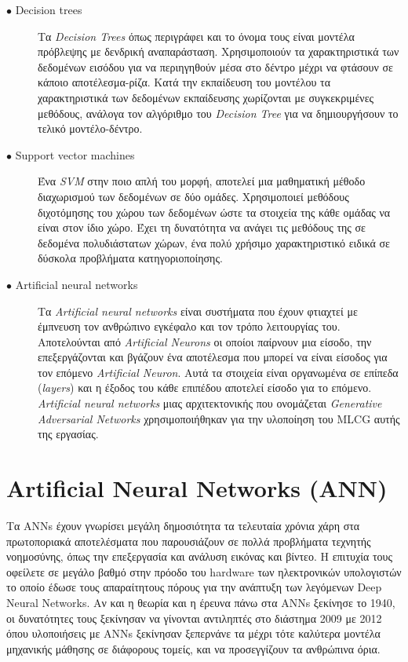 \begin{description}

\item[$\bullet$ Decision trees] Τα \textit{Decision Trees} όπως περιγράφει και το όνομα τους είναι μοντέλα πρόβλεψης με δενδρική αναπαράσταση. Χρησιμοποιούν τα χαρακτηριστικά των δεδομένων εισόδου για να περιηγηθούν μέσα στο δέντρο μέχρι να φτάσουν σε κάποιο αποτέλεσμα-ρίζα. Κατά την εκπαίδευση του μοντέλου τα χαρακτηριστικά των δεδομένων εκπαίδευσης χωρίζονται με συγκεκριμένες μεθόδους, ανάλογα τον αλγόριθμο του \textit{Decision Tree} για να δημιουργήσουν το τελικό μοντέλο-δέντρο.

\item[$\bullet$ Support vector machines] Ένα \textit{SVM} στην ποιο απλή του μορφή, αποτελεί μια μαθηματική μέθοδο διαχωρισμού των δεδομένων σε δύο ομάδες. Χρησιμοποιεί μεθόδους διχοτόμησης του χώρου των δεδομένων ώστε τα στοιχεία της κάθε ομάδας να είναι στον ίδιο χώρο. Έχει τη δυνατότητα να ανάγει τις μεθόδους της σε δεδομένα πολυδιάστατων χώρων, ένα πολύ χρήσιμο χαρακτηριστικό ειδικά σε δύσκολα προβλήματα κατηγοριοποίησης. 

\item[$\bullet$ Artificial neural networks] Τα \textit{Artificial neural networks} είναι συστήματα που έχουν φτιαχτεί με έμπνευση τον ανθρώπινο εγκέφαλο και τον τρόπο λειτουργίας του. Αποτελούνται από \textit{Artificial Neurons} οι οποίοι παίρνουν μια είσοδο, την επεξεργάζονται και βγάζουν ένα αποτέλεσμα που μπορεί να είναι είσοδος για τον επόμενο \textit{Artificial Neuron}. Αυτά τα στοιχεία είναι οργανωμένα σε επίπεδα (\textit{layers}) και η έξοδος του κάθε επιπέδου αποτελεί είσοδο για το επόμενο. \textit{Artificial neural networks} μιας αρχιτεκτονικής που ονομάζεται \textit{Generative Adversarial Networks} χρησιμοποιήθηκαν για την υλοποίηση του MLCG αυτής της εργασίας.

\end{description}



\section{Artificial Neural Networks (ANN)}
Τα ANNs έχουν γνωρίσει μεγάλη δημοσιότητα τα τελευταία χρόνια χάρη στα πρωτοποριακά αποτελέσματα που παρουσιάζουν σε πολλά προβλήματα τεχνητής νοημοσύνης, όπως την επεξεργασία και ανάλυση εικόνας και βίντεο. Η επιτυχία τους οφείλετε σε μεγάλο βαθμό στην πρόοδο του hardware των ηλεκτρονικών υπολογιστών το οποίο έδωσε τους απαραίτητους πόρους για την ανάπτυξη των λεγόμενων Deep Neural Networks. Αν και η θεωρία και η έρευνα πάνω στα ANNs ξεκίνησε το 1940, οι δυνατότητες τους ξεκίνησαν να γίνονται αντιληπτές στο διάστημα 2009 με 2012 όπου υλοποιήσεις με ANNs ξεκίνησαν ξεπερνάνε τα μέχρι τότε καλύτερα μοντέλα μηχανικής μάθησης σε διάφορους τομείς, και να προσεγγίζουν τα ανθρώπινα όρια.

